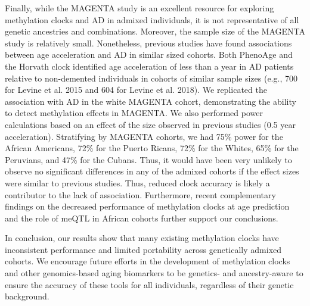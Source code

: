 Finally, while the MAGENTA study is an excellent resource for exploring methylation clocks and AD in admixed individuals, it is not representative of all genetic ancestries and combinations. Moreover, the sample size of the MAGENTA study is relatively small. Nonetheless, previous studies have found associations between age acceleration and AD in similar sized cohorts. Both PhenoAge \citep{levine_epigenetic_2018} and the Horvath clock \citep{levine_epigenetic_2015} identified age acceleration of less than a year in AD patients relative to non-demented individuals in cohorts of similar sample sizes (e.g., 700 for Levine et al. 2015 and 604 for Levine et al. 2018). We replicated the association with AD in the white MAGENTA cohort, demonstrating the ability to detect methylation effects in MAGENTA. We also performed power calculations based on an effect of the size observed in previous studies (0.5 year acceleration). Stratifying by MAGENTA cohorts, we had 75\% power for the African Americans, 72\% for the Puerto Ricans, 72\% for the Whites, 65\% for the Peruvians, and 47\% for the Cubans. Thus, it would have been very unlikely to observe no significant differences in any of the admixed cohorts if the effect sizes were similar to previous studies. Thus, reduced clock accuracy is likely a contributor to the lack of association. Furthermore, recent complementary findings on the decreased performance of methylation clocks at age prediction and the role of meQTL in African cohorts \citep{meeks_common_2025} further support our conclusions.


In conclusion, our results show that many existing methylation clocks have inconsistent performance and limited portability across genetically admixed cohorts. We encourage future efforts in the development of methylation clocks and other genomics-based aging biomarkers to be genetics- and ancestry-aware to ensure the accuracy of these tools for all individuals, regardless of their genetic background.

\clearpage